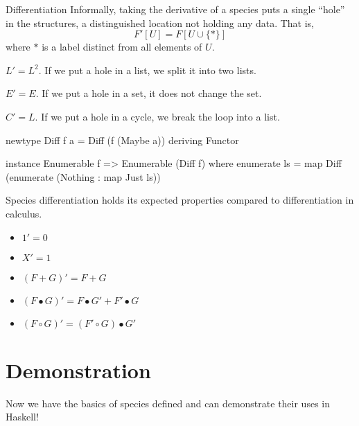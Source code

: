 \documentclass{beamer}
\begin{document}
\begin{frame}{Differentiation}
  Informally, taking the derivative of a species puts a single ``hole'' in the structures, a
  distinguished location not holding any data. That is,
  \[
    F'[U] = F[U \cup \{*\}]
  \]
  where \( * \) is a label distinct from all elements of \( U \).~\cite{yorgey}
  \pause{}
  \vfill
  \begin{exampleblock}{}
    \( L' = L^2 \).
    If we put a hole in a list, we split it into two lists.
  \end{exampleblock}
  \begin{exampleblock}{}
    \( E' = E \).
    If we put a hole in a set, it does not change the set.
  \end{exampleblock}
  \begin{exampleblock}{}
    \( C' = L \).
    If we put a hole in a cycle, we break the loop into a list.
  \end{exampleblock}
\end{frame}
\begin{frame}[fragile]
  \begin{code}
newtype Diff f a = Diff (f (Maybe a))
  deriving Functor

instance Enumerable f => Enumerable (Diff f) where
  enumerate ls = map Diff (enumerate (Nothing : map Just ls))
  \end{code}
\end{frame}
\begin{frame}
  Species differentiation holds its expected properties compared to differentiation in calculus.
  \begin{itemize}
    \item \( 1' = 0 \)
    \item \( X' = 1 \)
    \item \( (F + G)' = F + G \)
    \item \( (F \bullet G)' = F \bullet G' + F' \bullet G \)
    \item \( (F \circ G)' = (F' \circ G) \bullet G' \)
  \end{itemize}
\end{frame}

\section{Demonstration}
\begin{frame}
  Now we have the basics of species defined and can demonstrate their uses in Haskell!
\end{frame}
\end{document}
